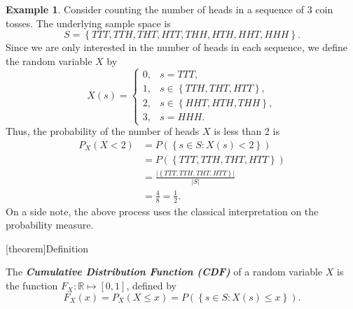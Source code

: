 \documentclass[12pt]{report}
\theoremstyle{definition}
\begin{document}
\newtheorem{probability distribution application eg}[theorem]{Example}
\begin{probability distribution application eg}
    Consider counting the number of heads in a sequence of 3 coin tosses. The
    underlying sample space is
    \[
        S = \left\{TTT,TTH,THT,HTT,THH,HTH,HHT,HHH\right\}.
    \]
    Since we are only interested in the number of heads in each sequence,
    we define the random variable $X$ by
    \[
        X(s)=
        \begin{cases}
            0, & s=TTT,\\
            1, & s\in\left\{TTH,THT,HTT\right\}, \\
            2, & s\in\left\{HHT,HTH,THH\right\}, \\
            3, & s=HHH.
        \end{cases} 
    \]
    Thus, the probability of the number of heads $X$ is less than 2 is
    \begin{align*}
        P_X(X<2)
        & =P(\left\{s\in S:X(s)<2\right\}) \\
        & =P(\left\{TTT,TTH,THT,HTT\right\}) \\
        & =\frac{\left|\left\{TTT,TTH,THT,HTT\right\}\right|}{|S|} \\
        & =\frac{4}{8}= \frac{1}{2}.
    \end{align*} 
    On a side note, the above process uses the classical interpretation on the
    probability measure.
\end{probability distribution application eg}

[theorem]{Definition}
\begin{cdf}
    The \textbf{\emph{Cumulative Distribution Function (CDF)}} of a random
    variable $X$ is the function $F_X:\mathbb{R}\mapsto[0,1]$, defined by
    \[
        F_X(x)=P_X(X\le x)=P(\left\{s\in S:X(s)\le x\right\}).
    \]
\end{cdf}
\end{document}
